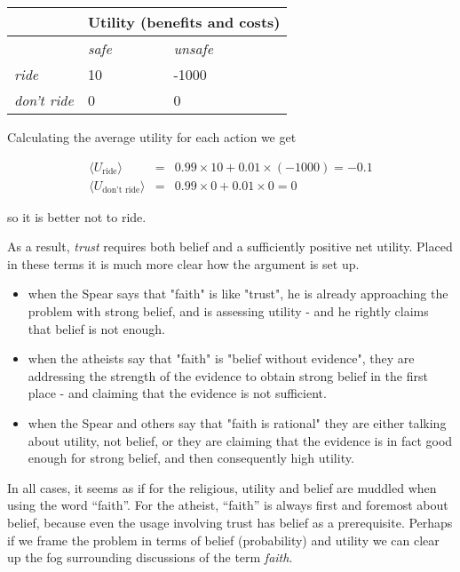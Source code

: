 \documentclass{tufte-book}
\begin{document}
\begin{tabular}{@{}lll@{}}
\toprule
 & \multicolumn{2}{c}{\textbf{Utility (benefits and costs)}}  \\ \midrule
 & \textit{safe} & \textit{unsafe}\\
\textit{ride} & 10 & -1000   \\
\textit{don't ride} & 0 & 0  \\ \bottomrule
\end{tabular}\vspace{.1in}

Calculating the average utility for each action we get

\begin{eqnarray*}
\langle U_{\mbox{ride}}\rangle &=& 0.99 \times 10 + 0.01\times (-1000) = -0.1 \\
\langle U_{\mbox{don't ride}}\rangle &=& 0.99 \times 0 + 0.01\times 0 = 0 
\end{eqnarray*}

so it is better not to ride.

As a result, \emph{trust} requires both belief and a sufficiently
positive net utility. Placed in these terms it is much more clear how
the argument is set up.

\begin{itemize}
\itemsep1pt\parskip0pt
\item
  when the Spear says that "faith" is like "trust", he is
  already approaching the problem with strong belief, and is assessing
  utility - and he rightly claims that belief is not enough.
\item
  when the atheists say that "faith" is "belief without evidence",
  they are addressing the strength of the evidence to obtain strong
  belief in the first place - and claiming that the evidence is not sufficient.
\item
  when the Spear and others say that "faith is rational" they are either talking about utility, not belief, or they are claiming that the
  evidence is in fact good enough for strong belief, and then
  consequently high utility.
\end{itemize}

In all cases, it seems as if for the religious, utility and belief are
muddled when using the word ``faith''. For the atheist, ``faith'' is
always first and foremost about belief, because even the usage involving
trust has belief as a prerequisite. Perhaps if we frame the problem in
terms of belief (probability) and utility we can clear up the fog
surrounding discussions of the term \emph{faith}.
\end{document}
